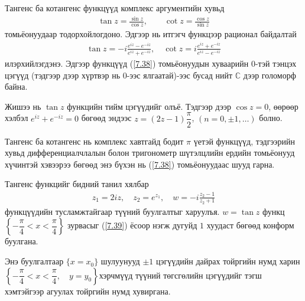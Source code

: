 Тангенс ба котангенс функцүүд комплекс аргументийн хувьд 
\begin{eqnarray}
\tan z=\frac{\sin z}{\cos z}, \qquad \cot z=\frac{\cos z}{\sin z}
\end{eqnarray}
томьёонуудаар тодорхойлогдоно. Эдгээр нь итгэгч функцээр рационал байдалтай
\begin{eqnarray} \label{7.38}
\tan z=-i\frac{e^{iz}-e^{-iz}}{e^{iz}+e^{-iz}}, \quad \cot z=i \frac{e^{iz}+e^{-iz}}{e^{iz}-e^{-iz}}
\end{eqnarray}
илэрхийлэгдэнэ. Эдгээр функцүүд (\ref{7.38}) томьёонуудын хуваарийн $0$-тэй тэнцэх цэгүүд (тэдгээр дээр хүртвэр нь $0$-ээс ялгаатай)-ээс бусад нийт $\mathbb{C}$ дээр голоморф байна. 

Жишээ нь $\tan z$ функцийн тийм цэгүүдийг олъё. Тэдгээр дээр $\cos z=0$, өөрөөр хэлбэл $e^{iz}+e^{-iz}=0$ бөгөөд эндээс $z=(2z-1)\dfrac{\pi}{2}$, $(n=0,\pm 1, \ldots)$ болно.

Тангенс ба котангенс нь комплекс хавтгайд бодит $\pi$ үетэй функцүүд, тэдгээрийн хувьд дифференциалчлалын болон тригонометр шүтэлцлийн ердийн томьёонууд хүчинтэй хэвээрээ бөгөөд энэ бүхэн нь (\ref{7.38}) томьёонуудаас шууд гарна.

Тангенс функцийг бидний танил хялбар
\begin{eqnarray} \label{7.39}
z_1=2iz, \quad z_2=e^{z_1}, \quad w=-i\frac{z_2-1}{z_2+1}
\end{eqnarray}
функцүүдийн тусламжтайгаар түүний буулгалтыг харуулъя. $w=\tan z$ функц $\left\{-\dfrac{\pi}{4}<x<\dfrac{\pi}{4}\right\}$ зурвасыг (\ref{7.39}) ёсоор нэгж дугуйд $1$ хуудаст бөгөөд конформ буулгана.

Энэ буулгалтаар $\{x=x_0\}$ шулуунууд $\pm 1$ цэгүүдийн дайрах тойргийн нумд харин  $\left\{-\dfrac{\pi}{4}<x<\dfrac{\pi}{4}, \quad y=y_0\right\}$хэрчмүүд түүний төгсгөлийн цэгүүдийг тэгш хэмтэйгээр агуулах тойргийн нумд хувиргана.

